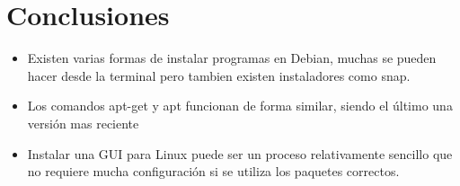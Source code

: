 \documentclass{article}
\begin{document}
\section{Conclusiones}
    \begin{itemize}
        \item Existen varias formas de instalar programas en Debian, muchas se pueden hacer desde la terminal pero tambien existen instaladores como snap.
        \item Los comandos apt-get y apt funcionan de forma similar, siendo el último una versión mas reciente
        \item Instalar una GUI para Linux puede ser un proceso relativamente sencillo que no requiere mucha configuración si se utiliza los paquetes correctos.
    \end{itemize}
    


		
	
\end{document}
